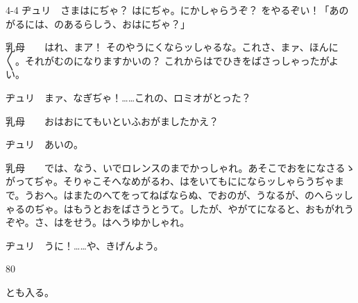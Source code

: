 \documentclass[tate,paper=b6j,jafontsize=9pt]{jlreq}
\begin{document}
\begin{azconvIndented}{4\zw}{-4\zw}
ヂュリ　さまはにぢゃ？ はにぢゃ。にかしゃらうぞ？ をやるぞい！「あのがるには、のあるらしう、おはにぢゃ？」

乳母　　はれ、まア！ そのやうにくならッしゃるな。これさ、まァ、ほんに{〳〵}。それがむのになりますかいの？ これからはでひきをばさっしゃったがよい。

ヂュリ　まァ、なぎぢゃ！……これの、ロミオがとった？

乳母　　おはおにてもいといふおがましたかえ？

ヂュリ　あいの。

乳母　　では、なう、いでロレンスのまでかっしゃれ。あそこでおをになさるゝがってぢゃ。そりゃこそへなめがるわ、はをいてもににならッしゃらうぢゃまで。うおへ。はまたのへてをってねばならぬ、でおのが、うなるが、のへらッしゃるのぢゃ。はもうとおをばさうとうて。したが、やがてになると、おもがれうぞや。さ、はをせう。はへうゆかしゃれ。

ヂュリ　うに！……や、きげんよう。

\end{azconvIndented}
\begin{azconvIndented}{8\zw}{0\zw}

とも入る。

\end{azconvIndented}
\end{document}
